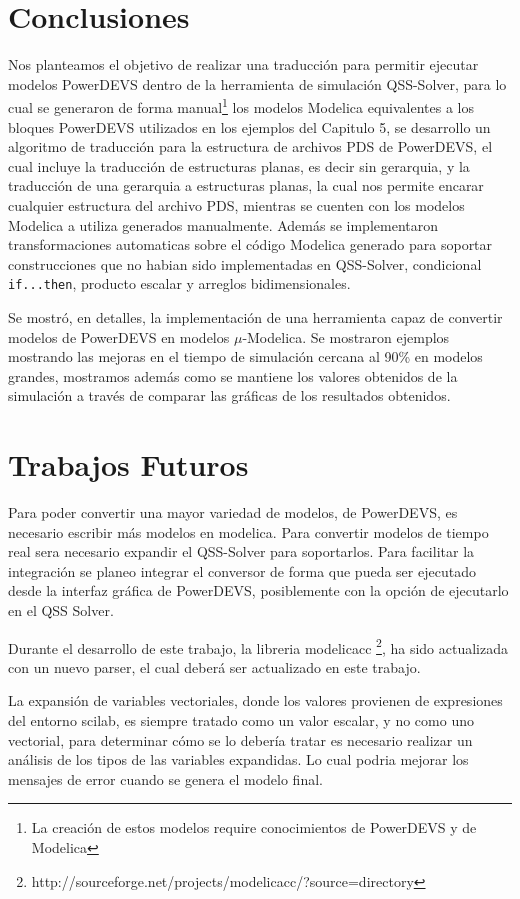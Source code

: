 
\section{Conclusiones}

	Nos planteamos el objetivo de realizar una traducción para permitir ejecutar modelos PowerDEVS dentro de la herramienta de simulación QSS-Solver, para lo cual se generaron de forma
	manual\footnote{La creación de estos modelos require conocimientos de PowerDEVS y de Modelica} los modelos Modelica equivalentes a los bloques PowerDEVS utilizados en los ejemplos 
	del Capitulo 5, se desarrollo un algoritmo de traducción para la estructura de archivos PDS de PowerDEVS, el cual incluye la traducción de estructuras planas, es decir sin 
	gerarquia, y la traducción de una gerarquia a estructuras planas, la cual nos permite encarar cualquier estructura del archivo PDS, mientras se cuenten con los modelos Modelica a utiliza
	generados manualmente. Además se implementaron transformaciones automaticas sobre el código Modelica generado para soportar construcciones que no habian sido implementadas en QSS-Solver, 
	condicional \texttt{if...then}, producto escalar y arreglos bidimensionales.

	Se mostró, en detalles, la implementación de una herramienta capaz de convertir modelos de PowerDEVS en modelos $\mu$-Modelica.  
	Se mostraron ejemplos mostrando las mejoras en el tiempo de simulación cercana al 90\% en modelos grandes, mostramos además como se mantiene los valores obtenidos de la 
	simulación a través de comparar las gráficas de los resultados obtenidos.

\section{Trabajos Futuros}
	Para poder convertir una mayor variedad de modelos, de PowerDEVS, es necesario escribir más modelos en modelica.
	Para convertir modelos de tiempo real sera necesario expandir el QSS-Solver para soportarlos.
	Para facilitar la integración se planeo integrar el conversor de forma que pueda ser ejecutado desde la interfaz gráfica de PowerDEVS, posiblemente 
	con la opción de ejecutarlo en el QSS Solver.

	Durante el desarrollo de este trabajo, la libreria modelicacc \footnote{http://sourceforge.net/projects/modelicacc/?source=directory}, ha sido actualizada 
	con un nuevo parser, el cual deberá ser actualizado en este trabajo.

	La expansión de variables vectoriales, donde los valores provienen de expresiones del entorno scilab, es siempre tratado como un valor escalar, y no como 
	uno vectorial, para determinar cómo se lo debería tratar es necesario realizar un análisis de los tipos de las variables expandidas. 
	Lo cual podria mejorar los mensajes de error cuando se genera el modelo final.

